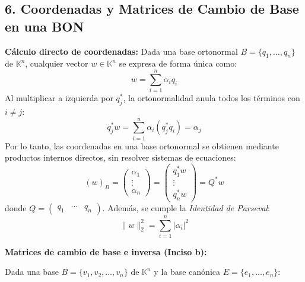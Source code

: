 \documentclass[11pt,a4paper]{article}
\begin{document}
\subsection*{6. Coordenadas y Matrices de Cambio de Base en una BON}


\textbf{Cálculo directo de coordenadas:} Dada una base ortonormal $B = \{q_1, \dots, q_n\}$ de $\mathbb{K}^n$, cualquier vector $w \in \mathbb{K}^n$ se expresa de forma única como:
\[
    w = \sum_{i=1}^n \alpha_i q_i
    \]
    Al multiplicar a izquierda por $q_j^*$, la ortonormalidad anula todos los términos con $i \neq j$:
    \[
        q_j^* w = \sum_{i=1}^n \alpha_i (q_j^* q_i) = \alpha_j
        \]
        Por lo tanto, las coordenadas en una base ortonormal se obtienen mediante productos internos directos, sin resolver sistemas de ecuaciones:
        \[
            (w)_B = \begin{pmatrix} \alpha_1 \\ \vdots \\ \alpha_n \end{pmatrix} = \begin{pmatrix} q_1^* w \\ \vdots \\ q_n^* w \end{pmatrix} = Q^* w
            \]
            donde $Q = \begin{pmatrix} q_1 & \cdots & q_n \end{pmatrix}$. Además, se cumple la \emph{Identidad de Parseval}:
            \[
                \|w\|_2^2 = \sum_{i=1}^n |\alpha_i|^2
                \]
                
    \vspace{0.6em}
    \noindent
    \textbf{Matrices de cambio de base e inversa (Inciso b):}
                
    Dada una base $B = \{v_1, v_2, \dots, v_n\}$ de $\mathbb{K}^n$ y la base canónica $E = \{e_1, \dots, e_n\}$:
    
\end{document}
